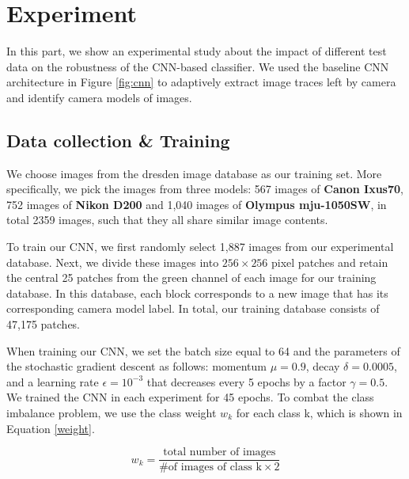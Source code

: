 \documentclass[a4paper, 9pt, twocolumn]{extarticle}
\begin{document}
\section{Experiment}
\label{section:Experiment}

In this part, we show an experimental study about the impact of different test data on the robustness of the CNN-based classifier. We used the baseline CNN architecture in Figure \ref{fig:cnn} to adaptively extract image traces left by camera and identify camera models of images.

\subsection*{Data collection \& Training}
\label{section:Data collection & Training}

We choose images from the dresden image database \cite{10.1145/1774088.1774427} as our training set. More specifically, we pick the images from three models: 567 images of \textbf{Canon Ixus70}, 752 images of \textbf{Nikon D200} and 1,040 images of \textbf{Olympus mju-1050SW}, in total 2359 images, such that they all share similar image contents.

To train our CNN, we first randomly select 1,887 images from our experimental database. Next, we divide these images into $ 256 \times 256 $ pixel patches and retain the central 25 patches from the green channel of each image for our training database. In this database, each block corresponds to a new image that has its corresponding camera model label. In total, our training database consists of 47,175 patches.

When training our CNN, we set the batch size equal to 64 and the parameters of the stochastic gradient descent as follows: momentum $ \mu = 0.9 $, decay $ \delta = 0.0005 $, and a learning rate $ \epsilon = 10^{-3} $ that decreases every 5 epochs by a factor $ \gamma = 0.5 $. We trained the CNN in each experiment for 45 epochs. To combat the class imbalance problem, we use the class weight $ w_k $ for each class k, which is shown in Equation \ref{weight}.

\begin{equation} \label{weight}
	w_k = \frac{\text{total number of images}}{\text{\# of images of class k} \times 2}
\end{equation}
\end{document}
